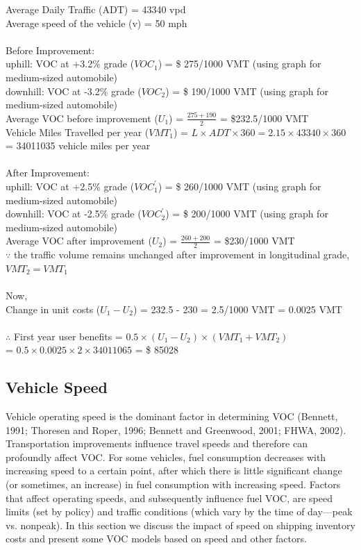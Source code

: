 Average Daily Traffic (ADT) = 43340 vpd\\
Average speed of the vehicle (v) = 50 mph\\\\
Before Improvement:\\
uphill: VOC at +3.2\% grade ($ {VOC}_1 $) = \$ 275/1000 VMT (using graph for medium-sized automobile)\\
downhill: VOC at -3.2\% grade ($ {VOC}_2 $) = \$ 190/1000 VMT (using graph for medium-sized automobile)\\
Average VOC before improvement ($ U_1 $) = $ \frac{275 + 190}{2} $ = \$232.5/1000 VMT\\
Vehicle Miles Travelled per year ($ {VMT}_1 $) = $ L \times ADT \times 360 = 2.15 \times 43340 \times 360 $ = 34011035 vehicle miles per year\\\\
After Improvement:\\
uphill: VOC at +2.5\% grade ($ {VOC}^{'}_1 $) = \$ 260/1000 VMT (using graph for medium-sized automobile)\\
downhill: VOC at -2.5\% grade ($ {VOC}^{'}_2 $) = \$ 200/1000 VMT (using graph for medium-sized automobile)\\
Average VOC after improvement ($ U_2 $) = $ \frac{260 + 200}{2} $ = \$230/1000 VMT\\
$ \because $ the traffic volume remains unchanged after improvement in longitudinal grade,\\
$ {VMT}_2 = {VMT}_1 $\\\\
Now,\\
Change in unit costs ($ U_1 - U_2 $) = 232.5 - 230 = 2.5/1000 VMT = 0.0025 VMT\\\\
$ \therefore $ First year user benefits = $ 0.5 \times (U_1 - U_2) \times ({VMT}_1 + {VMT}_2) $\\ = $ 0.5 \times 0.0025 \times 2 \times 34011065$ = \$ 85028
\subsection{Vehicle Speed}
Vehicle operating speed is the dominant factor in determining VOC (Bennett, 1991; Thoresen and Roper, 1996; Bennett and Greenwood, 2001; FHWA, 2002). Transportation improvements influence travel speeds and therefore can profoundly affect VOC. For some vehicles, fuel consumption decreases with increasing speed to a certain point, after which there is little significant change (or sometimes, an increase) in fuel consumption with increasing speed. Factors that affect operating speeds, and subsequently influence fuel VOC, are speed limits (set by policy) and traffic conditions (which vary by the time of day—peak vs. nonpeak). In this section we discuss the impact of speed on shipping inventory costs and present some VOC models based on speed and other factors.
